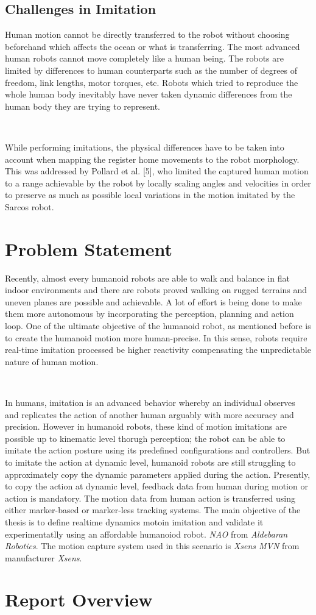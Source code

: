 \subsection*{Challenges in Imitation}

Human motion cannot be directly transferred to the robot without choosing beforehand which affects the ocean or what
is transferring. The most advanced human robots cannot move completely like a human being. The robots are limited 
by differences to human counterparts such as the number of degrees of freedom, link lengths, motor torques, etc. 
Robots which tried to reproduce the whole human body inevitably have never taken dynamic differences from the human 
body they are trying to represent.

~

While performing imitations, the physical differences have to be taken into account when mapping the register home 
movements to the robot morphology. This was addressed by Pollard et al. [5], who limited the captured human motion 
to a range achievable by the robot by locally scaling angles and velocities in order to preserve as much as possible 
local variations in the motion imitated by the Sarcos robot.


\section{Problem Statement}

Recently, almost every humanoid robots are able to walk and balance in flat indoor environments and there are robots 
proved walking on rugged terrains and uneven planes are possible and achievable. A lot of effort is being done to make
them more autonomous by incorporating the perception, planning and action loop. One of the ultimate objective of the 
humanoid robot, as mentioned before is to create the humanoid motion more human-precise. In this sense, robots require 
real-time imitation processed be higher reactivity compensating the unpredictable nature of human motion.

~

In humans, imitation is an advanced behavior whereby an individual observes and replicates the action of another 
human arguably with more accuracy and precision. However in humanoid robots, these kind of motion imitations are possible
up to kinematic level thorugh perception; the robot can be able to imitate the action posture using its predefined 
configurations and controllers. But to imitate the action at dynamic level, humanoid robots are still struggling to 
approximately copy the dynamic parameters applied during the action. Presently, to copy the action at dynamic level, 
feedback data from human during motion or action is mandatory. The motion data from human action is transferred using 
either marker-based or marker-less tracking systems. The main objective of the thesis is to define realtime dynamics 
motoin imitation and validate it experimentatlly using an affordable humanoiod robot. \textit{NAO} from \textit{Aldebaran
Robotics}. The motion capture system used in this scenario is \textit{Xsens MVN} from manufacturer \textit{Xsens}.

\section{Report Overview}
